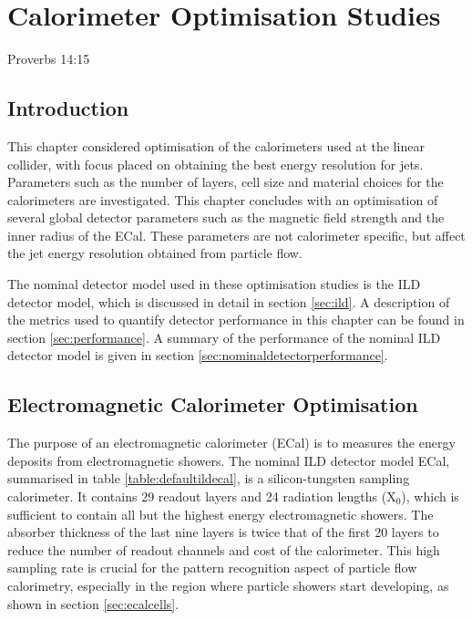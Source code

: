 \chapter{Calorimeter Optimisation Studies}
\label{chap:detopt}

{Proverbs 14:15}


\section{Introduction}
\label{sec:optimisationstudies}
This chapter considered optimisation of the calorimeters used at the linear collider, with focus placed on obtaining the best energy resolution for jets.  Parameters such as the number of layers, cell size and material choices for the calorimeters are investigated.  This chapter concludes with an optimisation of several global detector parameters such as the magnetic field strength and the inner radius of the ECal.  These parameters are not calorimeter specific, but affect the jet energy resolution obtained from particle flow. 

The nominal detector model used in these optimisation studies is the ILD detector model, which is discussed in detail in section \ref{sec:ild}.  A description of the metrics used to quantify detector performance in this chapter can be found in section \ref{sec:performance}.  A summary of the performance of the nominal ILD detector model is given in section \ref{sec:nominaldetectorperformance}.


\section{Electromagnetic Calorimeter Optimisation}
\label{sec:ecal}
The purpose of an electromagnetic calorimeter (ECal) is to measures the energy deposits from electromagnetic showers.  The nominal ILD detector model ECal, summarised in table \ref{table:defaultildecal}, is a silicon-tungsten sampling calorimeter.  It contains 29 readout layers and 24 radiation lengths ($\text{X}_{0}$), which is sufficient to contain all but the highest energy electromagnetic showers.  The absorber thickness of the last nine layers is twice that of the first 20 layers to reduce the number of readout channels and cost of the calorimeter.  This high sampling rate is crucial for the pattern recognition aspect of particle flow calorimetry, especially in the region where particle showers start developing, as shown in section \ref{sec:ecalcells}.  

